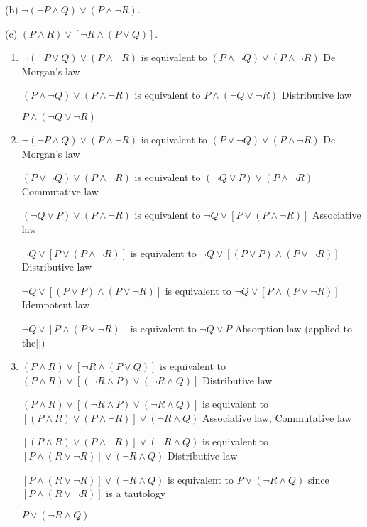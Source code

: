 \documentclass{article}
\begin{document}
(b) $\neg(\neg P \land Q) \lor (P \land \neg R)$.

(c) $(P \land R) \lor [\neg R \land (P \lor Q)]$.

\begin{enumerate}[label=(\alph*)]
    \item 
    $\neg(\neg P \lor Q) \lor (P \land \neg R)$ is equivalent to $(P \land \neg Q) \lor (P \land \neg R)$ De Morgan's law
    
    $(P \land \neg Q) \lor (P \land \neg R)$ is equivalent to $P \land (\neg Q \lor \neg R )$ Distributive law
    
    $P \land (\neg Q \lor \neg R )$ 
    \item
    $\neg(\neg P \land Q) \lor (P \land \neg R)$ is equivalent to $(P \lor \neg Q) \lor ( P \land \neg R)$ De Morgan's law
    
    $(P \lor \neg Q) \lor ( P \land \neg R)$ is equivalent to $(\neg Q \lor P) \lor ( P \land \neg R)$ Commutative law
    
    $(\neg Q \lor P) \lor ( P \land \neg R)$ is equivalent to $\neg Q \lor[P \lor (P \land \neg R)]$ Associative law
    
    $\neg Q \lor[P \lor (P \land \neg R)]$ is equivalent to $\neg Q \lor [(P \lor P) \land (P \lor \neg R)]$ Distributive law
    
   $\neg Q \lor [(P \lor P) \land (P \lor \neg R)]$ is equivalent to $\neg Q \lor [P \land (P \lor \neg R)]$ Idempotent law
   
   $\neg Q \lor [P \land (P \lor \neg R)]$ is equivalent to $\neg Q \lor P$ Absorption law (applied to the[])
    \item
    $(P \land R) \lor [\neg R \land (P \lor Q)]$ is equivalent to $(P \land R ) \lor [ (\neg R  \land P) \lor (\neg R\land Q )]$ Distributive law 
 
    $(P \land R) \lor [ (\neg R  \land P) \lor (\neg R\land Q )]$ is equivalent to $[(P \land R) \lor ( P \land  \neg R)] \lor  ( \neg R \land Q)$ Associative law, Commutative law
    
    $[(P \land R) \lor ( P \land  \neg R)] \lor  ( \neg R \land Q)$ is equivalent to $[P \land (R \lor \neg R)] \lor (\neg R \land Q)$ Distributive law
    
    $[P \land (R \lor \neg R)] \lor (\neg R \land Q)$ is equivalent to  $ P\lor (\neg R \land Q)$ since $[P \land (R \lor \neg R)]$ is a tautology 
    
    $ P\lor (\neg R \land Q)$
\end{enumerate}
\end{document}
